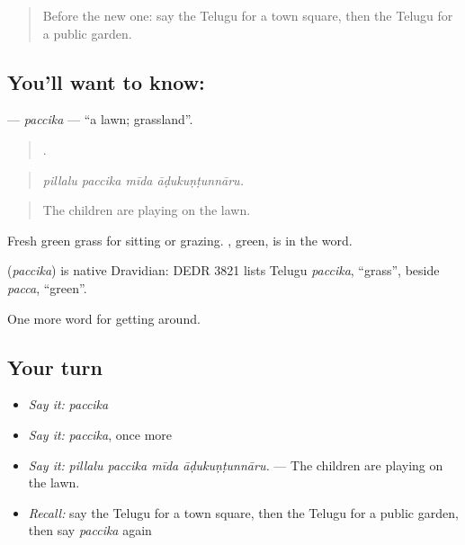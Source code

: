 \label{lesson:TE-C466-paccika}



\begin{quote}
Before the new one: say the Telugu for a town square, then the Telugu for a public garden.
\end{quote}

\subsection*{You'll want to know: }
\textbf{} — \emph{paccika} — \textquotedblleft{}a lawn; grassland\textquotedblright{}.

\begin{quote}
   .
\end{quote}

\begin{quote}
\emph{pillalu paccika mīda āḍukuṇṭunnāru.}
\end{quote}

\begin{quote}
The children are playing on the lawn.
\end{quote}

Fresh green grass for sitting or grazing. , green, is in the word.

\begin{cousinweb}
\textbf{} (\emph{paccika}) is native Dravidian: DEDR 3821 lists Telugu \emph{paccika}, \textquotedblleft{}grass\textquotedblright{}, beside \emph{pacca}, \textquotedblleft{}green\textquotedblright{}.
\end{cousinweb}

\begin{grammarlens}[title={What you've built}]
One more word for getting around.
\end{grammarlens}

\subsection*{Your turn}
\begin{itemize}
\raggedright
  \item \emph{Say it:} \emph{paccika}
  \item \emph{Say it:} \emph{paccika}, once more
  \item \emph{Say it:} \emph{pillalu paccika mīda āḍukuṇṭunnāru.} — The children are playing on the lawn.
  \item \emph{Recall:} say the Telugu for a town square, then the Telugu for a public garden, then say \emph{paccika} again
\end{itemize}

